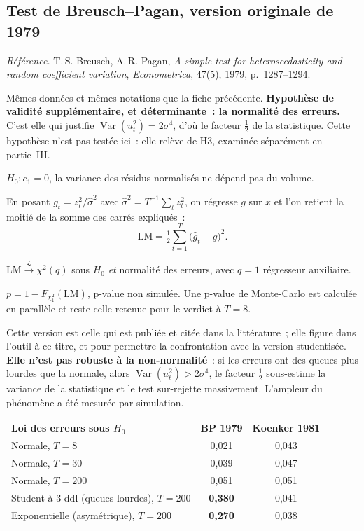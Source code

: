 \documentclass[a4paper,11pt]{article}
\newcommand{\refl}[1]{{\small\textcolor{maincolor!70!black}{\textit{Référence.} #1}}\par\smallskip}
\newcounter{ficheid}
\newenvironment{fiche}[1]{%
  \stepcounter{ficheid}%
  \phantomsection
  \subsection{#1}%
  \label{fiche:\theficheid}%
}{%
  \end{description}\vspace{0.5em}%
}
\newcommand{\Cadre}{%
  \begin{description}[leftmargin=0pt, style=unboxed, itemsep=3pt, topsep=3pt, parsep=2pt]%
  \item[\textcolor{financeblue}{\textbf{1. Cadre, notations et hypothèses de validité (non testées).}}]}
\newcommand{\Hzero}{\item[\textcolor{financeblue}{\textbf{2. Hypothèse nulle.}}]}
\newcommand{\Stat}{\item[\textcolor{financeblue}{\textbf{3. Statistique de test.}}]}
\newcommand{\Loi}{\item[\textcolor{financeblue}{\textbf{4. Loi sous $H_0$.}}]}
\newcommand{\Pval}{\item[\textcolor{financeblue}{\textbf{5. p-value.}}]}
\newcommand{\Usage}{\item[\textcolor{financeblue}{\textbf{6. Usage et limites.}}]}
\begin{document}
\begin{fiche}{Test de Breusch--Pagan, version originale de 1979}
\refl{T.\,S. Breusch, A.\,R. Pagan, \emph{A simple test for heteroscedasticity and random
coefficient variation}, \emph{Econometrica}, 47(5), 1979, p.~1287--1294.}
\Cadre
Mêmes données et mêmes notations que la fiche précédente. \textbf{Hypothèse de validité
supplémentaire, et déterminante~: la normalité des erreurs.} C'est elle qui justifie
$\operatorname{Var}(u_t^2) = 2\sigma^4$, d'où le facteur $\tfrac12$ de la statistique. Cette
hypothèse n'est pas testée ici~: elle relève de H3, examinée séparément en partie~III.
\Hzero
$H_0 : c_1 = 0$, la variance des résidus normalisés ne dépend pas du volume.
\Stat
En posant $g_t = z_t^2 / \hat\sigma^2$ avec $\hat\sigma^2 = T^{-1}\sum_t z_t^2$, on régresse $g$
sur $x$ et l'on retient la moitié de la somme des carrés expliqués~:
\[
  \mathrm{LM} = \tfrac{1}{2}\sum_{t=1}^{T}\big(\hat g_t - \bar g\big)^2 .
\]
\Loi
$\mathrm{LM} \xrightarrow{\ \mathcal{L}\ } \chi^2(q)$ sous $H_0$ \emph{et} normalité des erreurs,
avec $q = 1$ régresseur auxiliaire.
\Pval
$p = 1 - F_{\chi^2_1}(\mathrm{LM})$, p-value non simulée. Une p-value de Monte-Carlo est calculée
en parallèle et reste celle retenue pour le verdict à $T = 8$.
\Usage
Cette version est celle qui est publiée et citée dans la littérature~; elle figure dans l'outil à
ce titre, et pour permettre la confrontation avec la version studentisée. \textbf{Elle n'est pas
robuste à la non-normalité}~: si les erreurs ont des queues plus lourdes que la normale, alors
$\operatorname{Var}(u_t^2) > 2\sigma^4$, le facteur $\tfrac12$ sous-estime la variance de la
statistique et le test sur-rejette massivement. L'ampleur du phénomène a été mesurée par
simulation.

\begin{center}
\small
{}
\begin{tabular}{@{}p{6.4cm}cc@{}}
\rowcolor{tableheader}
\textcolor{financeblue}{\textbf{Loi des erreurs sous $H_0$}} &
\textcolor{financeblue}{\textbf{BP 1979}} &
\textcolor{financeblue}{\textbf{Koenker 1981}} \\
Normale, $T = 8$    & 0,021 & 0,043 \\
Normale, $T = 30$   & 0,039 & 0,047 \\
Normale, $T = 200$  & 0,051 & 0,051 \\
Student à 3 ddl (queues lourdes), $T = 200$ & \textbf{0,380} & 0,041 \\
Exponentielle (asymétrique), $T = 200$      & \textbf{0,270} & 0,038 \\
\end{tabular}
\end{center}


\end{fiche}
\end{document}
